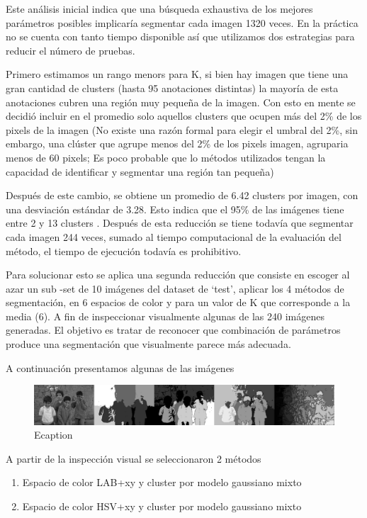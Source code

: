\documentclass[10pt,twocolumn,letterpaper]{article}
\begin{document}
Este análisis inicial indica que una búsqueda exhaustiva de los mejores parámetros posibles implicaría segmentar cada imagen  1320 veces.  En la práctica no se cuenta con tanto tiempo disponible así que utilizamos dos estrategias para reducir el número de pruebas.

Primero estimamos un rango menors para K, si bien hay imagen que tiene una gran cantidad de clusters (hasta 95 anotaciones distintas) la mayoría de esta anotaciones cubren una región muy pequeña de la imagen. Con esto en mente se decidió incluir en el promedio solo aquellos clusters que ocupen más del 2\% de los pixels de la imagen (No existe una razón formal para elegir el umbral del 2\%, sin embargo, una clúster que agrupe menos del 2\% de los pixels imagen, agruparia menos de 60 pixels; Es poco probable que lo métodos utilizados tengan la capacidad de identificar y segmentar una región tan pequeña) 

Después de este cambio, se obtiene un promedio de 6.42 clusters por imagen, con una desviación estándar de 3.28. Esto indica que el 95\% de las imágenes tiene entre 2 y  13 clusters . Después de esta reducción se tiene todavía que segmentar cada imagen 244 veces, sumado al tiempo computacional de la evaluación del método, el tiempo de ejecución todavía es prohibitivo. 

Para solucionar esto se aplica una segunda reducción que consiste en escoger al azar un sub -set de 10 imágenes del dataset de ‘test’, aplicar los 4 métodos de segmentación, en 6 espacios de color y para un valor de K que corresponde a  la media (6). A fin de inspeccionar visualmente algunas de las 240 imágenes generadas. El objetivo es tratar de reconocer que combinación de parámetros produce una segmentación que visualmente parece más adecuada.

A continuación presentamos algunas de las imágenes

\begin{figure}
\begin{center}
\includegraphics[width=0.95\linewidth]
                   {img/Kidshsvxy.jpg}
\end{center}
   \caption{Ecaption}
\label{fig:short}
\end{figure}


A partir de la inspección visual se seleccionaron 2 métodos 
\begin{enumerate}
	\item Espacio de color LAB+xy y cluster por modelo gaussiano mixto
	\item Espacio de color HSV+xy y cluster por modelo gaussiano mixto
\end{enumerate}
	
\end{document}

